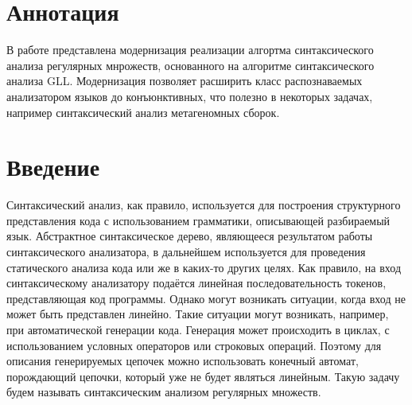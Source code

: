 \documentclass[14pt]{matmex-diploma}
\begin{document}
\maketitle
\tableofcontents


\section*{Аннотация}

В работе представлена модернизация реализации алгортма синтаксического анализа регулярных мнрожеств, основанного на алгоритме синтаксического анализа GLL. Модернизация позволяет расширить класс распознаваемых анализатором языков до конъюнктивных, что полезно в некоторых задачах, например синтаксический анализ метагеномных сборок.

\section*{Введение}

Синтаксический анализ, как правило, используется для построения структурного представления кода с использованием грамматики, описывающей разбираемый язык. Абстрактное синтаксическое дерево, являющееся результатом работы синтаксического анализатора, в дальнейшем используется для проведения статического анализа кода или же в каких-то других целях. Как правило, на вход синтаксическому анализатору подаётся линейная последовательность токенов, представляющая код программы. Однако могут возникать ситуации, когда вход не может быть представлен линейно. Такие ситуации могут возникать, например, при автоматической генерации кода. Генерация может происходить в циклах, с использованием условных операторов или строковых операций. Поэтому для описания генерируемых цепочек можно использовать конечный автомат, порождающий цепочки, который уже не будет являться линейным. Такую задачу будем называть синтаксическим анализом регулярных множеств.
\end{document}
